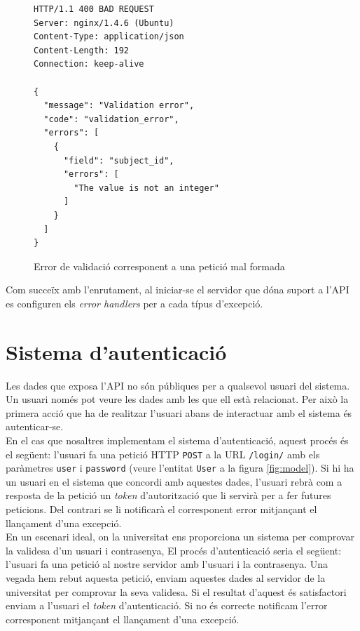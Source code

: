 \begin{figure}[h!]
	\begin{verbatim}
HTTP/1.1 400 BAD REQUEST
Server: nginx/1.4.6 (Ubuntu)
Content-Type: application/json
Content-Length: 192
Connection: keep-alive

{
  "message": "Validation error", 
  "code": "validation_error", 
  "errors": [
    {
      "field": "subject_id", 
      "errors": [
        "The value is not an integer"
      ]
    }
  ]
}
	\end{verbatim}
	\caption{Error de validació corresponent a una petició mal formada}
	\label{fig:validation_error}
\end{figure}
Com succeïx amb l'enrutament, al iniciar-se el servidor que dóna suport a l'\ac{API} es configuren els \emph{error handlers} per a cada típus d'excepció. 

\section{Sistema d'autenticació} \label{sistema_autenticacio}

Les dades que exposa l'\ac{API} no són públiques per a qualsevol usuari del sistema. Un usuari només pot veure les dades amb les que ell està relacionat. Per això la primera acció que ha de realitzar l'usuari abans de interactuar amb el sistema és autenticar-se.\\

En el cas que nosaltres implementam el sistema d'autenticació, aquest procés és el següent: l'usuari fa una petició \ac{HTTP} \texttt{POST} a la \ac{URL} \texttt{/login/} amb els paràmetres \texttt{user} i \texttt{password} (veure l'entitat \texttt{User} a la figura \ref{fig:model}). Si hi ha un usuari en el sistema que concordi amb aquestes dades, l'usuari rebrà com a resposta de la petició un \emph{token} d'autorització que li servirà per a fer futures peticions. Del contrari se li notificarà el corresponent error mitjançant el llançament d'una excepció.\\

En un escenari ideal, on la universitat ens proporciona un sistema per comprovar la validesa d'un usuari i contrasenya, El procés d'autenticació seria el següent: l'usuari fa una petició al nostre servidor amb l'usuari i la contrasenya. Una vegada hem rebut aquesta petició, enviam aquestes dades al servidor de la universitat per comprovar la seva validesa. Si el resultat d'aquest és satisfactori enviam a l'usuari el \emph{token} d'autenticació. Si no és correcte notificam l'error corresponent mitjançant el llançament d'una excepció.\\

